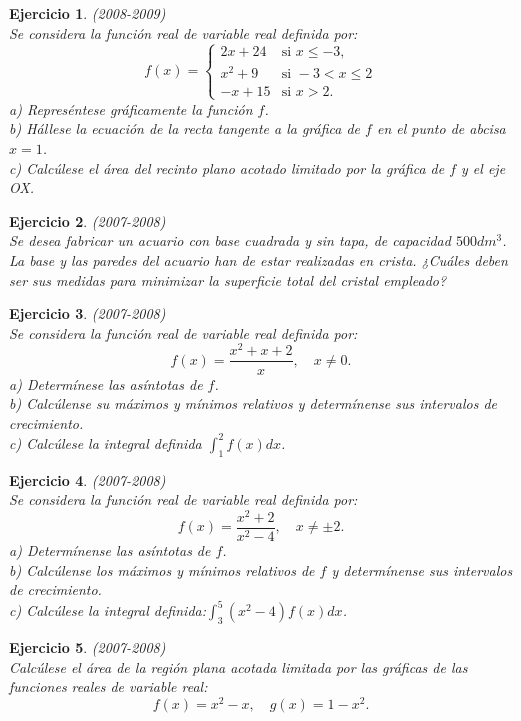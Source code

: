 \documentclass[12pt, a4paper]{amsart}
\newtheorem{ejer}{Ejercicio}
\begin{document}
\begin{ejer}\em (2008-2009)\\
Se considera la función real de variable real definida por:
\begin{equation*}
f(x)=\left \{ \begin{matrix} 2x+24 & \mbox{si } x\leq -3,
\\ x^2+9 & \mbox{si } -3<x\leq 2
\\ -x+15 & \mbox{si } x>2. \end{matrix}\right. 
\end{equation*}
a) Represéntese gráficamente la función $f$.\\
b) Hállese la ecuación de la recta tangente a la gráfica de $f$ en el punto de abcisa $x=1$.\\
c) Calcúlese el área del recinto plano acotado limitado por la gráfica de $f$ y el eje OX.
\end{ejer}

\begin{ejer}\em  (2007-2008)\\
Se desea fabricar un acuario con base cuadrada y sin tapa, de capacidad $500 dm^3$. La base y las paredes del acuario han de estar realizadas en crista. ¿Cuáles deben ser sus medidas para minimizar la superficie total del cristal empleado?
\end{ejer}

\begin{ejer}\em (2007-2008)\\
Se considera la función real de variable real definida por:
$$
f(x)=\frac{x^2+x+2}{x}, \quad x\neq 0.
$$
a) Determínese las asíntotas de $f$.\\
b) Calcúlense su máximos y mínimos relativos y determínense sus intervalos de crecimiento.\\
c) Calcúlese la integral definida $\int_1^2 f(x)dx$.
\end{ejer}

\begin{ejer}\em (2007-2008)\\
Se considera la función real de variable real definida por:
$$
f(x)=\frac{x^2+2}{x^2-4}, \quad x\neq \pm 2.
$$
a) Determínense las asíntotas de $f$.\\
b) Calcúlense los máximos y mínimos relativos de $f$ y determínense sus intervalos de crecimiento.\\
c) Calcúlese la integral definida:$\int_3^5(x^2-4)f(x)dx$.
\end{ejer}


\begin{ejer}\em (2007-2008)\\
Calcúlese el área de la región plana acotada limitada por las gráficas de las funciones reales de variable real:
$$
f(x)=x^2-x, \quad g(x)=1-x^2.
$$
\end{ejer}
\end{document}
